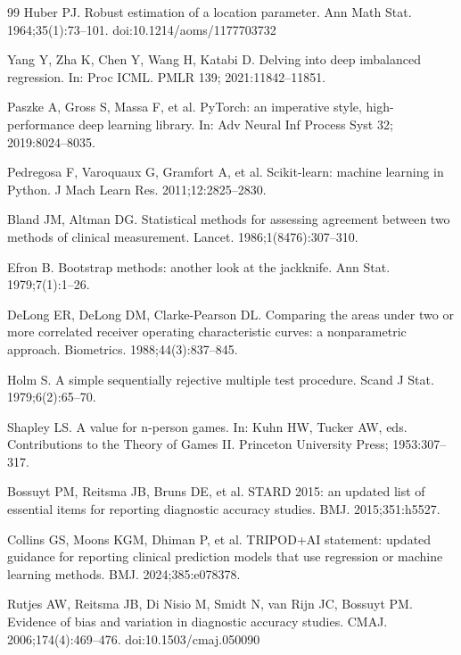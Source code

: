 \documentclass[10pt,a4paper,twocolumn]{article}
\begin{document}
\begin{thebibliography}{99}
 Huber PJ. Robust estimation of a location parameter. Ann Math Stat. 1964;35(1):73--101. doi:10.1214/aoms/1177703732

 Yang Y, Zha K, Chen Y, Wang H, Katabi D. Delving into deep imbalanced regression. In: Proc ICML. PMLR 139; 2021:11842--11851.

 Paszke A, Gross S, Massa F, et al. PyTorch: an imperative style, high-performance deep learning library. In: Adv Neural Inf Process Syst 32; 2019:8024--8035.

 Pedregosa F, Varoquaux G, Gramfort A, et al. Scikit-learn: machine learning in Python. J Mach Learn Res. 2011;12:2825--2830.

 Bland JM, Altman DG. Statistical methods for assessing agreement between two methods of clinical measurement. Lancet. 1986;1(8476):307--310.

 Efron B. Bootstrap methods: another look at the jackknife. Ann Stat. 1979;7(1):1--26.

 DeLong ER, DeLong DM, Clarke-Pearson DL. Comparing the areas under two or more correlated receiver operating characteristic curves: a nonparametric approach. Biometrics. 1988;44(3):837--845.

 Holm S. A simple sequentially rejective multiple test procedure. Scand J Stat. 1979;6(2):65--70.

 Shapley LS. A value for n-person games. In: Kuhn HW, Tucker AW, eds. Contributions to the Theory of Games II. Princeton University Press; 1953:307--317.

 Bossuyt PM, Reitsma JB, Bruns DE, et al. STARD 2015: an updated list of essential items for reporting diagnostic accuracy studies. BMJ. 2015;351:h5527.

 Collins GS, Moons KGM, Dhiman P, et al. TRIPOD+AI statement: updated guidance for reporting clinical prediction models that use regression or machine learning methods. BMJ. 2024;385:e078378.

 Rutjes AW, Reitsma JB, Di Nisio M, Smidt N, van Rijn JC, Bossuyt PM. Evidence of bias and variation in diagnostic accuracy studies. CMAJ. 2006;174(4):469--476. doi:10.1503/cmaj.050090

\end{thebibliography}
\end{document}
